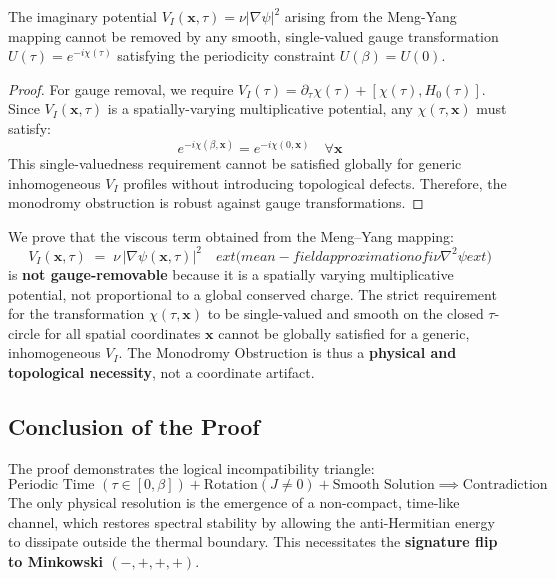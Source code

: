 \documentclass[11pt]{article}
\begin{document}
\begin{lemma}
The imaginary potential $V_I(\mathbf{x},\tau) = \nu|\nabla\psi|^2$ arising from the Meng-Yang mapping 
cannot be removed by any smooth, single-valued gauge transformation $U(\tau) = e^{-i\chi(\tau)}$ 
satisfying the periodicity constraint $U(\beta) = U(0)$.
\end{lemma}

\begin{proof}
For gauge removal, we require $V_I(\tau) = \partial_\tau\chi(\tau) + [\chi(\tau), H_0(\tau)]$.
Since $V_I(\mathbf{x},\tau)$ is a spatially-varying multiplicative potential, any $\chi(\tau,\mathbf{x})$ 
must satisfy:
\begin{equation}
e^{-i\chi(\beta,\mathbf{x})} = e^{-i\chi(0,\mathbf{x})} \quad \forall \mathbf{x}
\end{equation}
This single-valuedness requirement cannot be satisfied globally for generic inhomogeneous 
$V_I$ profiles without introducing topological defects. Therefore, the monodromy obstruction 
is robust against gauge transformations.
\end{proof}

We prove that the viscous term obtained from the Meng--Yang mapping:
\[
        V_I(\mathbf x,\tau) \;=\; \nu\,|\nabla\psi(\mathbf x,\tau)|^2 \quad 	ext{(mean-field approximation of } i\nu\nabla^2\psi 	ext{)}
\]
is \textbf{not gauge-removable} because it is a spatially varying multiplicative potential, not proportional to a global conserved charge. The strict requirement for the transformation $\chi(\tau, \mathbf{x})$ to be single-valued and smooth on the closed $\tau$-circle for all spatial coordinates $\mathbf{x}$ cannot be globally satisfied for a generic, inhomogeneous $V_I$. The Monodromy Obstruction is thus a \textbf{physical and topological necessity}, not a coordinate artifact.

\subsection{Conclusion of the Proof}

The proof demonstrates the logical incompatibility triangle:
\[
    \text{Periodic Time } (\tau \in [0,\beta]) + \text{Rotation} (J \neq 0) + \text{Smooth Solution} \implies \text{Contradiction}
\]
The only physical resolution is the emergence of a non-compact, time-like channel, which restores spectral stability by allowing the anti-Hermitian energy to dissipate outside the thermal boundary. This necessitates the \textbf{signature flip to Minkowski $(-,+,+,+)$}.
\end{document}
